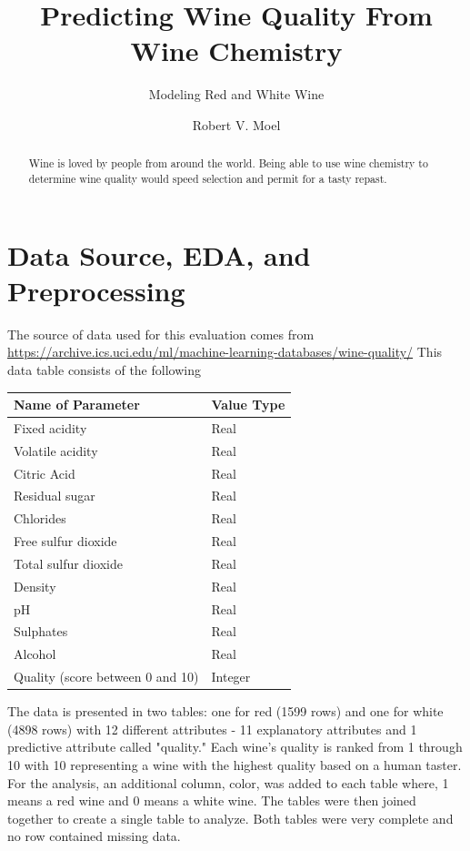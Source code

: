 \documentclass[]{article}
\title{Predicting Wine Quality From Wine Chemistry}
\subtitle{Modeling Red and White Wine}
\author{Robert V. Moel}
\begin{document}
\maketitle
\newpage
\begin{abstract}
Wine is loved by people from around the world.  Being able to use wine chemistry to determine wine quality would speed selection and permit for a tasty repast.
\end{abstract}
\newpage
\section{Data Source, EDA, and Preprocessing}
The source of data used for this evaluation comes from \url{https://archive.ics.uci.edu/ml/machine-learning-databases/wine-quality/}  This data table consists of the following


\begin{table}[ht]
	\centering
	\begin{tabular}{|l | l|}
		\hline
		Name of Parameter & Value Type \\
		\hline
		Fixed acidity & Real\\
		Volatile acidity &  Real\\
		Citric Acid &  Real\\
		Residual sugar &  Real\\
		Chlorides &  Real\\
		Free sulfur dioxide &  Real\\
		Total sulfur dioxide &  Real\\
		Density &  Real\\
		pH &  Real\\
		Sulphates &  Real\\
		Alcohol &  Real\\
		Quality (score between 0 and 10) &  Integer \\
		\hline	
	\end{tabular}		
\end{table}
The data is presented in two tables: one for red (1599 rows) and one for white (4898 rows) with 12 different attributes - 11 explanatory attributes and 1 predictive attribute called "quality."  Each wine's quality is ranked from 1 through 10 with 10 representing a wine with the highest quality based on a human taster.  For the analysis, an additional column, color, was added to each table where, 1 means a red wine and 0 means a white wine.  The tables were then joined together to create a single table to analyze.  Both tables were very complete and no row contained missing data.
\end{document}
